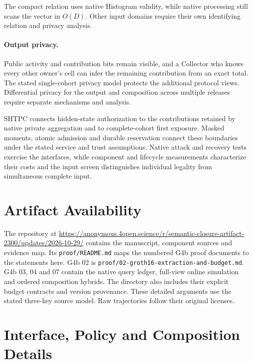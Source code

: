 \documentclass[conference,compsoc]{IEEEtran}
\theoremstyle{definition}
\numberwithin{equation}{section}
\numberwithin{table}{section}
\numberwithin{figure}{section}
\theoremstyle{plain}
\begin{document}
The compact relation uses native Histogram validity, while native processing
still scans the vector in \(O(D)\). Other input domains require their own
identifying relation and privacy analysis.

\paragraph{Output privacy.}

Public activity and contribution bits remain visible, and a Collector who knows every other owner's cell can infer the remaining contribution from an exact total. The stated single-cohort privacy model protects the additional protocol views. Differential privacy for the output and composition across multiple releases require separate mechanisms and analysis.

SHTPC connects hidden-state authorization to the contributions retained by native private aggregation and to complete-cohort first exposure. Masked moments, atomic admission and durable reservation connect these boundaries under the stated service and trust assumptions. Native attack and recovery tests exercise the interfaces, while component and lifecycle measurements characterize their costs and the input screen distinguishes individual legality from simultaneous complete input.


\section{Artifact Availability}
\label{sec:artifact}
The repository at
\url{https://anonymous.4open.science/r/semantic-closure-artifact-2300/updates/2026-10-29/}
contains the manuscript, component sources and evidence map.
\label{sec:artifact-proofs}
Its \nolinkurl{proof/README.md} maps the numbered G4b proof documents to the
statements here. G4b 02 is
\nolinkurl{proof/02-groth16-extraction-and-budget.md}.
G4b 03, 04 and 07 contain the native query ledger, full-view online simulation
and ordered composition hybrids. The directory also includes their explicit
budget contracts and version provenance. These detailed arguments use the
stated three-key source model. Raw trajectories follow their original licenses.

\FloatBarrier
\clearpage
\label{boundary:references}
{\footnotesize
\printbibliography}
\clearpage
\appendices
\section{Interface, Policy and Composition Details}
\label{boundary:appendix}
\label{sec:composition-failures}
\end{document}
